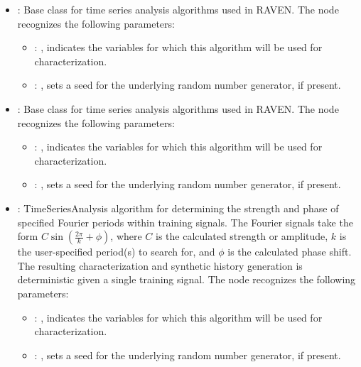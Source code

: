 \begin{itemize}
    \item {}:
      Base class for time series analysis algorithms used in RAVEN.
      The  node recognizes the following parameters:
        \begin{itemize}
          \item {}: , 
            indicates the variables for which this algorithm will be used for characterization.
          \item {}: , 
            sets a seed for the underlying random number generator, if present.
      \end{itemize}

    \item {}:
      Base class for time series analysis algorithms used in RAVEN.
      The  node recognizes the following parameters:
        \begin{itemize}
          \item {}: , 
            indicates the variables for which this algorithm will be used for characterization.
          \item {}: , 
            sets a seed for the underlying random number generator, if present.
      \end{itemize}

    \item {}:
      TimeSeriesAnalysis algorithm for determining the strength and phase of
      specified Fourier periods within training signals. The Fourier signals take
      the form $C\sin(\frac{2\pi}{k}+\phi)$, where $C$ is the calculated strength
      or amplitude, $k$ is the user-specified period(s) to search for, and $\phi$
      is the calculated phase shift. The resulting characterization and synthetic
      history generation is deterministic given a single training signal.
      The  node recognizes the following parameters:
        \begin{itemize}
          \item {}: , 
            indicates the variables for which this algorithm will be used for characterization.
          \item {}: , 
            sets a seed for the underlying random number generator, if present.
      \end{itemize}


\end{itemize}

